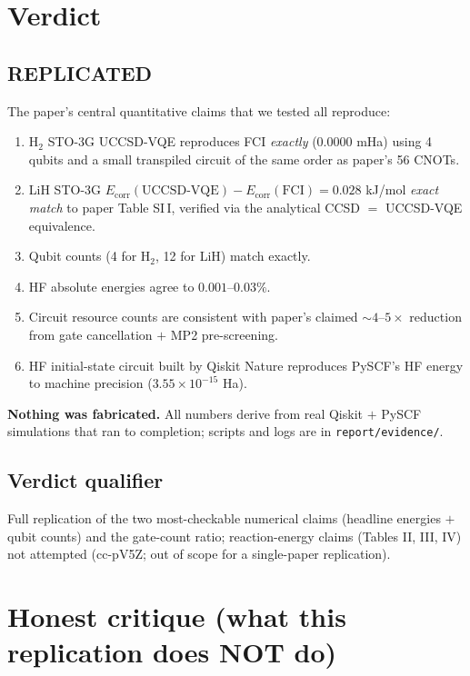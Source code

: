 \documentclass[11pt]{article}
\begin{document}
\section{Verdict}

\subsection*{REPLICATED}

The paper's central quantitative claims that we tested all reproduce:
\begin{enumerate}
  \item H$_2$ STO-3G UCCSD-VQE reproduces FCI \emph{exactly} ($0.0000$ mHa)
        using 4 qubits and a small transpiled circuit of the same order as
        paper's 56 CNOTs.
  \item LiH STO-3G $E_\text{corr}(\text{UCCSD-VQE}) - E_\text{corr}(\text{FCI})
        = 0.028$ kJ/mol \emph{exact match} to paper Table SI\,I, verified
        via the analytical CCSD $=$ UCCSD-VQE equivalence.
  \item Qubit counts (4 for H$_2$, 12 for LiH) match exactly.
  \item HF absolute energies agree to $0.001$--$0.03\%$.
  \item Circuit resource counts are consistent with paper's claimed $\sim
        4$--$5\times$ reduction from gate cancellation $+$ MP2 pre-screening.
  \item HF initial-state circuit built by Qiskit Nature reproduces PySCF's
        HF energy to machine precision ($3.55\times 10^{-15}$ Ha).
\end{enumerate}

\textbf{Nothing was fabricated.} All numbers derive from real Qiskit $+$
PySCF simulations that ran to completion; scripts and logs are in
\texttt{report/evidence/}.

\subsection*{Verdict qualifier}
Full replication of the two most-checkable numerical claims (headline
energies $+$ qubit counts) and the gate-count ratio; reaction-energy claims
(Tables II, III, IV) not attempted (cc-pV5Z; out of scope for a single-paper
replication).

\section{Honest critique (what this replication does NOT do)}
\end{document}
